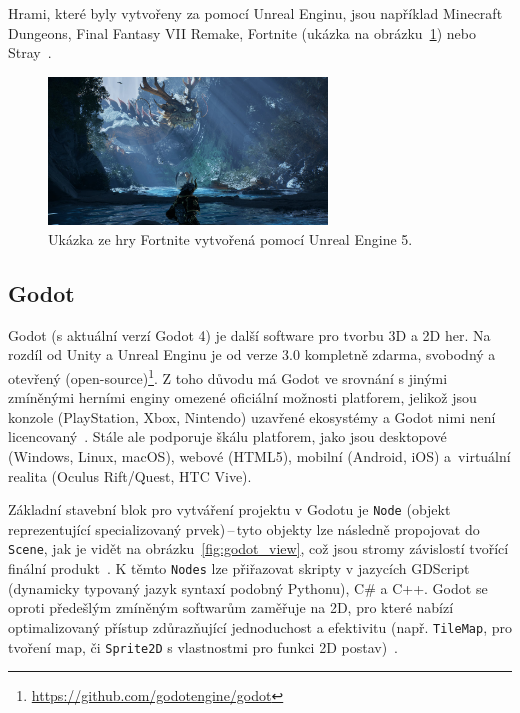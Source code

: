 Hrami, které byly vytvořeny za pomocí Unreal Enginu, jsou například Minecraft Dungeons, Final Fantasy VII Remake, Fortnite (ukázka na obrázku~\ref{fig:fortnite-unreal_engine}) nebo Stray~\cite{unreal_engine}.

\begin{figure}[H]
	\centering
	\includegraphics[width=0.66\textwidth]{obrazky-figures/ch2/fortnite.png}
	\caption{Ukázka ze hry Fortnite vytvořená pomocí Unreal Engine 5.~\cite{unreal_engine}}
	\label{fig:fortnite-unreal_engine}
\end{figure}

\subsection*{Godot}
Godot (s aktuální verzí Godot 4) je další software pro tvorbu 3D a 2D her. Na rozdíl od Unity a Unreal Enginu je od verze 3.0 kompletně zdarma, svobodný a otevřený (open-source)\footnote{\url{https://github.com/godotengine/godot}}. Z toho důvodu má Godot ve srovnání s jinými zmíněnými herními enginy omezené oficiální možnosti platforem, jelikož jsou konzole (PlayStation, Xbox, Nintendo) uzavřené ekosystémy a Godot nimi není licencovaný~\cite{Godot_Engine_consoles}. Stále ale podporuje škálu platforem, jako jsou desktopové (Windows, Linux, macOS), webové (HTML5), mobilní (Android, iOS) a~virtuální realita (Oculus Rift/Quest, HTC Vive).

Základní stavební blok pro vytváření projektu v Godotu je \verb|Node| (objekt reprezentující specializovaný prvek)\,--\,tyto objekty lze následně propojovat do \verb|Scene|, jak je vidět na obrázku~\ref{fig:godot_view}, což jsou stromy závislostí tvořící finální produkt~\cite{bradfield2018godot}. K těmto \verb|Nodes| lze přiřazovat skripty v jazycích GDScript (dynamicky typovaný jazyk syntaxí podobný Pythonu), C\# a C++\cite{GameEngineWizardry}. Godot se oproti předešlým zmíněným softwarům zaměřuje na 2D, pro které nabízí optimalizovaný přístup zdůrazňující jednoduchost a efektivitu (např. \verb|TileMap|, pro tvoření map, či \verb|Sprite2D| s vlastnostmi pro funkci 2D postav)~\cite{Godot_Engine}.

